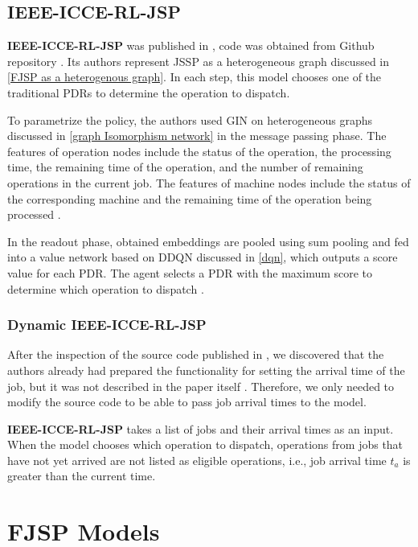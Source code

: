 \subsection{IEEE-ICCE-RL-JSP}

\textbf{IEEE-ICCE-RL-JSP} was published in \cite{10226873}, code was obtained from Github repository \cite{github_ieee_icce_rl_jsp}. Its authors represent JSSP as a heterogeneous graph discussed in \ref{FJSP as a heterogenous graph}. In each step, this model chooses one of the traditional PDRs to determine the operation to dispatch.
\par
To parametrize the policy, the authors used GIN on heterogeneous graphs discussed in \ref{graph Isomorphism network} in the message passing phase. The features of operation nodes include the status of the operation, the processing time, the remaining time of the operation, and the number of remaining operations in the current job. The features of machine nodes include the status of the corresponding machine and the remaining time of the operation being processed \cite{10226873}.
\par
In the readout phase, obtained embeddings are pooled using sum pooling and fed into a value network based on DDQN discussed in \ref{dqn}, which outputs a score value for each PDR. The agent selects a PDR with the maximum score to determine which operation to dispatch \cite{10226873}.

\subsubsection{Dynamic IEEE-ICCE-RL-JSP}

After the inspection of the source code \cite{github_ieee_icce_rl_jsp} published in \cite{10226873}, we discovered that the authors already had prepared the functionality for setting the arrival time of the job, but it was not described in the paper itself \cite{10226873}. Therefore, we only needed to modify the source code to be able to pass job arrival times to the model. 
\par
\textbf{IEEE-ICCE-RL-JSP} takes a list of jobs and their arrival times as an input. When the model chooses which operation to dispatch, operations from jobs that have not yet arrived are not listed as eligible operations, i.e., job arrival time $t_a$ is greater than the current time.

\section{FJSP Models}

